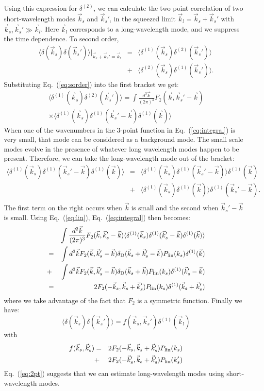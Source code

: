 \documentclass[prd,amsmath,amssymb,floatfix,superscriptaddress,nofootinbib,twocolumn]{revtex4-1}
\def\be{\begin{equation}}
\def\ee{\end{equation}}
\def\bea{\begin{eqnarray}}
\def\eea{\end{eqnarray}}
\newcommand{\vs}{\nonumber\\}
\newcommand{\vk}{\vec{k}}
\newcommand{\ec}[1]{Eq.~(\ref{eq:#1})}
\newcommand{\eql}[1]{\label{eq:#1}}
\newcommand{\peikai}[1]{{\color{blue} #1}}
\begin{document}
Using this expression for $\delta^{(2)}$, we can calculate the two-point correlation of two short-wavelength modes $\vk_s$ and $\vk_s'$, in the squeezed limit $\vk_l=\vk_s+\vk_s'$ with $\vk_s,\vk_s' \gg \vk_l$. Here $\vk_l$ corresponds to a long-wavelength mode, and we suppress the time dependence. To second order,
\bea 
 \langle {\delta}(\vec{k}_s){\delta}(\vec{k}_s') \rangle|_{\vk_s+\vk_s'=\vk_l}&=&
  \langle {\delta}^{(1)}(\vec{k}_s){\delta}^{(2)}(\vec{k}_s') \rangle\vs
  &+&\langle {\delta}^{(2)}(\vec{k}_s){\delta}^{(1)}(\vec{k}_s') \rangle.
\eea 
Substituting \ec{sorder} into the first bracket we get:
\bea 
\langle {\delta}^{(1)}(\vec{k}_s){\delta}^{(2)}(\vec{k}_s') \rangle =  \int \frac{d^3\vec{k}}{(2\pi)^3} F_2 (\vec{k},\vec{k}_s'-\vec{k})\vs
\times \langle {\delta}^{(1)}(\vec{k}_s){\delta}^{(1)}(\vec{k}_s'-\vec{k}){\delta}^{(1)}(\vec{k}) \rangle \eql{integral}
\eea 
When one of the wavenumbers in the 3-point function in \ec{integral} is very small, that mode can be considered as a background mode. The small scale modes evolve in the presence of whatever long wavelength modes happen to be present. Therefore,  \peikai{we can take the long-wavelength mode out of the bracket:}
\bea
\langle
\delta^{(1)}(\vk_{s}) \delta^{(1)}(\vk_{s}'-\vk){\delta^{(1)}}(\vk) 
\rangle
&=&\langle {\delta^{(1)}}(\vk_{s}) {\delta^{(1)}}(\vk_{s}'-\vk) \rangle {\delta^{(1)}}(\vk)  \vs
&+&\langle {\delta^{(1)}}(\vk_{s}) {\delta^{(1)}}(\vk) \rangle {\delta^{(1)}}(\vk_s'-\vk) .
\vs
\eql{contraction}
\eea
The first term on the right occurs when $\vk$ is small and the second when $\vk_s'-\vk$ is small.
Using \ec{lin}, \ec{integral} then becomes:
\bea 
&&\int \frac{d^3\vec{k}}{(2\pi)^3} F_2 (\vec{k},\vec{k}_s'-\vec{k})\langle {\delta}^{(1)}(\vec{k}_s){\delta}^{(1)}(\vec{k}_s'-\vec{k}){\delta}^{(1)}(\vec{k}) \rangle \vs
&=&\int d^3\vk F_2(\vec{k},\vec{k}_s'-\vec{k}) \delta_{\rm D}(\vk_s+\vk_s'-\vk)P_{\rm lin}(k_s){\delta}^{(1)}(\vec{k}) \vs
&+&\int d^3\vk F_2(\vec{k},\vec{k}_s'-\vec{k}) \delta_{\rm D}(\vk_s+\vk)P_{\rm lin}(k_s){\delta}^{(1)}(\vk_s'-\vk) \vs
&=&2F_2(-\vk_s,\vk_s+\vk_s')P_{\rm lin}(k_s){\delta}^{(1)}(\vk_s+\vk_s')
\eea 
where we take advantage of the fact that $F_2$ is a symmetric function. Finally we have:
\be 
\langle {\delta}(\vec{k}_s){\delta}(\vec{k}_s') \rangle =f(\vec{k}_s,\vec{k}_s'){\delta}^{(1)}(\vec{k}_l) \eql{2pt}
\ee 
with
\bea
f(\vec{k}_s,\vec{k}_s')&=&2F_2(-\vec{k}_s,\vec{k}_s+\vec{k}_s')P_{\rm lin}(k_s)\vs
&+&2F_2(-\vec{k}_s',\vec{k}_s+\vec{k}_s')P_{\rm lin}(k_s')       
\eea 
\ec{2pt} suggests that we can estimate long-wavelength modes using short-wavelength modes.
\end{document}
